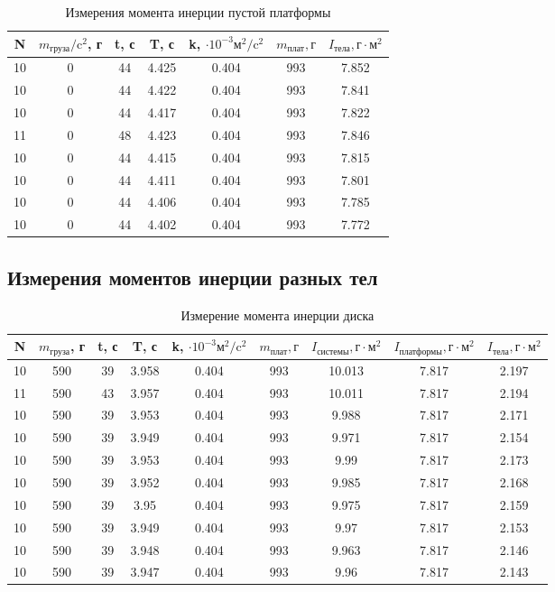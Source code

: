 \documentclass[a4paper,12pt]{article} %
\begin{document}
\begin{table} \label{пустая} \caption{Измерения момента инерции пустой платформы} \begin{tabular}{|c|c|c|c|c|c|c|} \hline N & $m_\text{груза}/\text{c}^2$, г & t, с & T, с & k, $\cdot 10^{-3}\text{м}^2/\text{c}^2$ & $m_\text{плат}, г$& $I_\text{тела}, \text{г}\cdot \text{м}^2$ \\ \hline 10 & 0 & 44 & 4.425 & 0.404 & 993 & 7.852 \\ \hline 10 & 0 & 44 & 4.422 & 0.404 & 993 & 7.841 \\ \hline 10 & 0 & 44 & 4.417 & 0.404 & 993 & 7.822 \\ \hline 11 & 0 & 48 & 4.423 & 0.404 & 993 & 7.846 \\ \hline 10 & 0 & 44 & 4.415 & 0.404 & 993 & 7.815 \\ \hline 10 & 0 & 44 & 4.411 & 0.404 & 993 & 7.801 \\ \hline 10 & 0 & 44 & 4.406 & 0.404 & 993 & 7.785 \\ \hline 10 & 0 & 44 & 4.402 & 0.404 & 993 & 7.772 \\ \hline \end{tabular} \end{table}


\subsection{Измерения моментов инерции разных тел}
\begin{table} \label{Диск} \caption{Измерение момента инерции диска} \begin{tabular}{|c|c|c|c|c|c|c|c|c|} \hline N & $m_\text{груза}$, г & t, с & T, с & k, $\cdot 10^{-3}\text{м}^2/\text{c}^2$ & $m_\text{плат}, г$ & $I_\text{системы}, \text{г}\cdot \text{м}^2$ &$I_\text{платформы}, \text{г}\cdot \text{м}^2$ & $I_\text{тела}, \text{г}\cdot \text{м}^2$ \\ \hline 10 & 590 & 39 & 3.958 & 0.404 & 993 & 10.013 & 7.817 & 2.197 \\ \hline 11 & 590 & 43 & 3.957 & 0.404 & 993 & 10.011 & 7.817 & 2.194 \\ \hline 10 & 590 & 39 & 3.953 & 0.404 & 993 & 9.988 & 7.817 & 2.171 \\ \hline 10 & 590 & 39 & 3.949 & 0.404 & 993 & 9.971 & 7.817 & 2.154 \\ \hline 10 & 590 & 39 & 3.953 & 0.404 & 993 & 9.99 & 7.817 & 2.173 \\ \hline 10 & 590 & 39 & 3.952 & 0.404 & 993 & 9.985 & 7.817 & 2.168 \\ \hline 10 & 590 & 39 & 3.95 & 0.404 & 993 & 9.975 & 7.817 & 2.159 \\ \hline 10 & 590 & 39 & 3.949 & 0.404 & 993 & 9.97 & 7.817 & 2.153 \\ \hline 10 & 590 & 39 & 3.948 & 0.404 & 993 & 9.963 & 7.817 & 2.146 \\ \hline 10 & 590 & 39 & 3.947 & 0.404 & 993 & 9.96 & 7.817 & 2.143 \\ \hline \end{tabular} \end{table}
\end{document}
